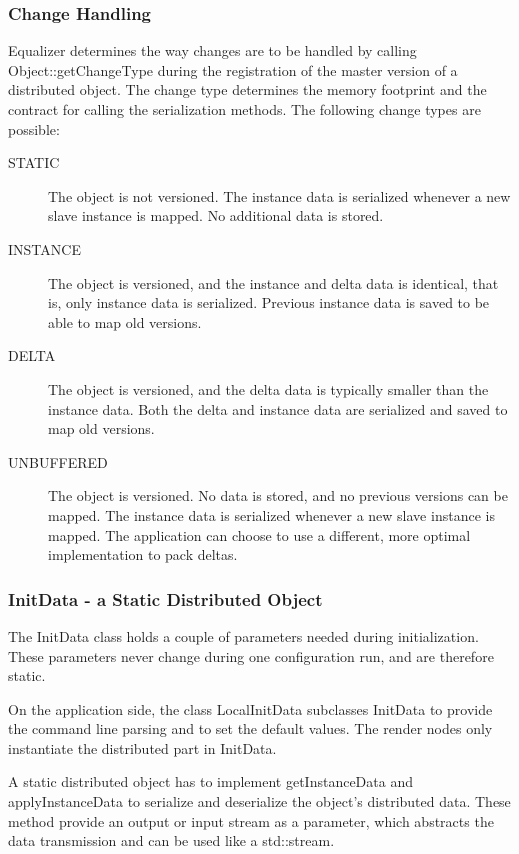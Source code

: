 \documentclass[10pt,a4]{scrartcl}
\begin{document}
\subsubsection{Change Handling}

Equalizer determines the way changes are to be handled by calling
\textsf{Object::get\-Change\-Type} during the registration of the master
version of a distributed object. The change type determines the memory
footprint and the contract for calling the serialization methods. The
following change types are possible:

\begin{description}
  \item[STATIC] The object is not versioned. The instance data is
    serialized whenever a new slave instance is mapped. No additional
    data is stored.
  \item[INSTANCE] The object is versioned, and the instance and delta
    data is identical, that is, only instance data is
    serialized. Previous instance data is saved to be able to map old
    versions.
  \item[DELTA] The object is versioned, and the delta data is typically
    smaller than the instance data. Both the delta and instance data are
    serialized and saved to map old versions.
  \item[UNBUFFERED] The object is versioned. No data is stored, and no
    previous versions can be mapped. The instance data is serialized
    whenever a new slave instance is mapped. The application can choose
    to use a different, more optimal implementation to pack deltas.
\end{description}

\subsubsection{\label{sInitData}InitData - a Static Distributed Object}

The \textsf{InitData} class holds a couple of parameters needed during
initialization. These parameters never change during one configuration
run, and are therefore static.

On the application side, the class \textsf{LocalInitData} subclasses
\textsf{InitData} to provide the command line parsing and to set the
default values. The render nodes only instantiate the distributed part
in \textsf{InitData}.

A static distributed object has to implement \textsf{getInstanceData}
and \textsf{applyInstanceData} to serialize and deserialize the object's
distributed data. These method provide an output or input stream as a
parameter, which abstracts the data transmission and can be used like a
\textsf{std::stream}. 
\end{document}
